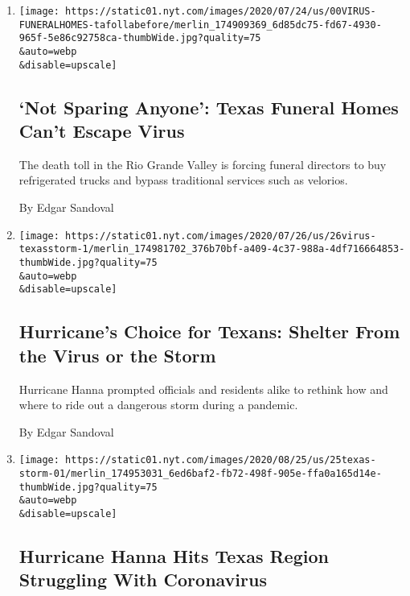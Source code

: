\begin{enumerate}
\def\labelenumi{\arabic{enumi}.}
\item
  \href{/2020/07/28/us/coronavirus-texas-funeral-homes.html}{}

  \texttt{[image: https://static01.nyt.com/images/2020/07/24/us/00VIRUS-FUNERALHOMES-tafollabefore/merlin\_174909369\_6d85dc75-fd67-4930-965f-5e86c92758ca-thumbWide.jpg?quality=75\\\&auto=webp\\\&disable=upscale]}

  \hypertarget{not-sparing-anyone-texas-funeral-homes-cant-escape-virus}{%
  \subsection{`Not Sparing Anyone': Texas Funeral Homes Can't Escape
  Virus}\label{not-sparing-anyone-texas-funeral-homes-cant-escape-virus}}

  The death toll in the Rio Grande Valley is forcing funeral directors
  to buy refrigerated trucks and bypass traditional services such as
  velorios.

  By Edgar Sandoval
\item
  \href{/2020/07/26/us/virus-texas-storm.html}{}

  \texttt{[image: https://static01.nyt.com/images/2020/07/26/us/26virus-texasstorm-1/merlin\_174981702\_376b70bf-a409-4c37-988a-4df716664853-thumbWide.jpg?quality=75\\\&auto=webp\\\&disable=upscale]}

  \hypertarget{hurricanes-choice-for-texans-shelter-from-the-virus-or-the-storm}{%
  \subsection{Hurricane's Choice for Texans: Shelter From the Virus or
  the
  Storm}\label{hurricanes-choice-for-texans-shelter-from-the-virus-or-the-storm}}

  Hurricane Hanna prompted officials and residents alike to rethink how
  and where to ride out a dangerous storm during a pandemic.

  By Edgar Sandoval
\item
  \href{/2020/07/25/us/hanna-storm-texas.html}{}

  \texttt{[image: https://static01.nyt.com/images/2020/08/25/us/25texas-storm-01/merlin\_174953031\_6ed6baf2-fb72-498f-905e-ffa0a165d14e-thumbWide.jpg?quality=75\\\&auto=webp\\\&disable=upscale]}

  \hypertarget{hurricane-hanna-hits-texas-region-struggling-with-coronavirus}{%
  \subsection{Hurricane Hanna Hits Texas Region Struggling With
  Coronavirus}\label{hurricane-hanna-hits-texas-region-struggling-with-coronavirus}}


\end{enumerate}
